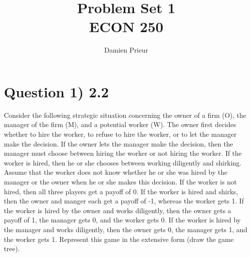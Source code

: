 \documentclass{article}
\author{Damien Prieur}
\title{Problem Set 1 \\ ECON 250}
\date{}
\begin{document}
\maketitle

\section*{Question 1) 2.2}
Consider the following strategic situation concerning the owner of a firm (O), the manager of the firm (M), and a potential worker (W).
The owner first decides whether to hire the worker, to refuse to hire the worker, or to let the manager make the decision.
If the owner lets the manager make the decision, then the manager must choose between hiring the worker or not hiring the worker.
If the worker is hired, then he or she chooses between working diligently and shirking.
Assume that the worker does not know whether he or she was hired by the manager or the owner when he or she makes this decision.
If the worker is not hired, then all three players get a payoff of 0.
If the worker is hired and shirks, then the owner and manger each get a payoff of -1, whereas the worker gets 1.
If the worker is hired by the owner and works diligently, then the owner gets a payoff of 1, the manager gets 0, and the worker gets 0.
If the worker is hired by the manager and works diligently, then the owner gets 0, the manager gets 1, and the worker gets 1.
Represent this game in the extensive form (draw the game tree).
\\
\end{document}
